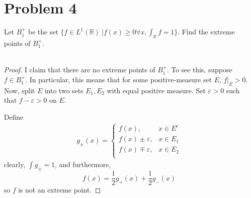 \documentclass[fontsize=11pt]{scrartcl} %
\numberwithin{equation}{section} %
\numberwithin{figure}{section} %
\numberwithin{table}{section} %
\newcommand{\R}{\mathbb{R}}
\begin{document}
\newpage

\section*{Problem 4}
Let $B_1^+$ be the set $\{f\in L^1(\R)\ | f(x)\geq 0 \forall x, \int_{\R}f
=1\}$.
Find the extreme points of $B_1^+$.
\\
\\
\begin{proof}
    I claim that there are no extreme points of $B_1^+$. To see this, suppose
    $f\in B_1^+$. In particular, this means that for some positive-measure set
    $E$, $f|_E > 0$. Now, split $E$ into two sets $E_1, E_2$ with equal positive
    measure. Set $\varepsilon>0$ such that $f-\varepsilon >0$ on $E$.

    Define
    \[
\begin{aligned}
    g_{\pm}(x) =
    \begin{cases}
        f(x), &x\in E^c\\
        f(x)\pm\varepsilon, &x\in E_1\\
        f(x)\mp\varepsilon, &x\in E_2\\
    \end{cases}
\end{aligned}
    \]
    clearly, $\int g_{\pm} = 1$, and furthermore,
    \[
        f(x) = \frac{1}{2}g_+(x) + \frac{1}{2}g_-(x)
    \]
    so $f$ is not an extreme point.
\end{proof}

\newpage
\end{document}
